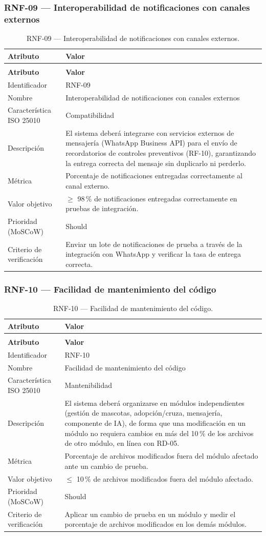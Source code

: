 \documentclass[journal,onecolumn]{IEEEtran}
\makeatletter
\newenvironment{atributos}[2]{%
	\small
	\begin{longtable}{@{}>{\raggedright\arraybackslash}p{4.2cm} >{\raggedright\arraybackslash}p{11.2cm}@{}}
		\caption{#2}\label{tab:#1}\\
		\toprule
		\textbf{Atributo} & \textbf{Valor} \\
		\midrule
		\endfirsthead
		\multicolumn{2}{@{}l}{\small\itshape (continuación)}\\
		\toprule
		\textbf{Atributo} & \textbf{Valor} \\
		\midrule
		\endhead
		\bottomrule
		\endlastfoot
	}{%
	\end{longtable}
	\normalsize
}
\makeatother
\begin{document}
	\subsubsection{RNF-09 --- Interoperabilidad de notificaciones con canales externos}
	
	\begin{atributos}{RNF-09}{RNF-09 --- Interoperabilidad de notificaciones con canales externos.}
		Identificador & RNF-09 \\
		Nombre & Interoperabilidad de notificaciones con canales externos \\
		Característica ISO 25010 & Compatibilidad \\
		Descripción & El sistema deberá integrarse con servicios externos de mensajería (WhatsApp Business API) para el envío de recordatorios de controles preventivos (RF-10), garantizando la entrega correcta del mensaje sin duplicarlo ni perderlo. \\
		Métrica & Porcentaje de notificaciones entregadas correctamente al canal externo. \\
		Valor objetivo & $\geq$ 98\,\% de notificaciones entregadas correctamente en pruebas de integración. \\
		Prioridad (MoSCoW) & Should \\
		Criterio de verificación & Enviar un lote de notificaciones de prueba a través de la integración con WhatsApp y verificar la tasa de entrega correcta. \\
	\end{atributos}
	
	\subsubsection{RNF-10 --- Facilidad de mantenimiento del código}
	
	\begin{atributos}{RNF-10}{RNF-10 --- Facilidad de mantenimiento del código.}
		Identificador & RNF-10 \\
		Nombre & Facilidad de mantenimiento del código \\
		Característica ISO 25010 & Mantenibilidad \\
		Descripción & El sistema deberá organizarse en módulos independientes (gestión de mascotas, adopción/cruza, mensajería, componente de IA), de forma que una modificación en un módulo no requiera cambios en más del 10\,\% de los archivos de otro módulo, en línea con RD-05. \\
		Métrica & Porcentaje de archivos modificados fuera del módulo afectado ante un cambio de prueba. \\
		Valor objetivo & $\leq$ 10\,\% de archivos modificados fuera del módulo afectado. \\
		Prioridad (MoSCoW) & Should \\
		Criterio de verificación & Aplicar un cambio de prueba en un módulo y medir el porcentaje de archivos modificados en los demás módulos. \\
	\end{atributos}
	
\end{document}
